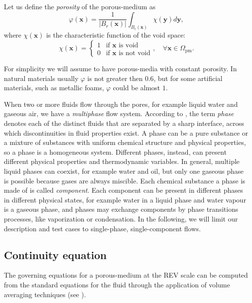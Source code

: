 Let us define the \emph{porosity} of the porous-medium as
\begin{equation}
\varphi(\mathbf{x}) = \frac{1}{|B_r(\mathbf{x})|} \int_{B_r(\mathbf{x})} \chi 
(\mathbf{y}) d\mathbf{y},
\end{equation}
where $\chi(\mathbf{x})$ is the characteristic function of the void space:
\begin{equation}
\chi(\mathbf{x}) =
\begin{cases}
1 &\text{if $\mathbf{x}$ is void}\\
0 &\text{if $\mathbf{x}$ is not void}
\end{cases}, \quad \forall \mathbf{x} \in \Omega_\text{pm}.
\end{equation}

For simplicity we will assume to have porous-media with constant porosity. In 
natural materials usually $\varphi$ is not greater then $0.6$, but for some 
artificial materials, such as metallic foams, $\varphi$ could be almost $1$.

When two or more fluids flow through the pores, for example liquid water and gaseous air, we have a \emph{multiphase} flow system. According to \cite{main:helmig}, the term \emph{phase} denotes each of the distinct fluids that are separated by a sharp interface, across which discontinuities in fluid properties exist. A phase can be a pure substance or a mixture of substances with uniform chemical structure and physical properties, so a phase is a homogeneous system. Different phases, instead, can present different physical properties and thermodynamic variables.
In general, multiple liquid phases can coexist, for example water and oil, but only one gaseous phase is possible because gases are always miscible.
Each chemical substance a phase is made of is called \emph{component}. Each component can be present in different phases in different physical states, for example water in a liquid phase and water vapour is a gaseous phase, and phases may exchange components by phase transitions processes, like vaporization or condensation.
In the following, we will limit our description and test cases to single-phase, single-component flows.
%
\subsection{Continuity equation}
The governing equations for a porous-medium at the REV scale can be computed 
from the standard equations for the fluid through the application of volume 
averaging techniques (see \cite{volaver:withakerbook}).

